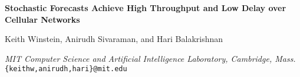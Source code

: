 \documentclass[csaild4,portrait]{xa0poster}
\title{}
\author{}
\affiliation{}
\begin{document}
\maketitle
\vspace{-7.9in} %

\begin{centering}
{\large \bf Stochastic Forecasts Achieve High Throughput and Low Delay over Cellular Networks}

\vspace{\baselineskip}

Keith Winstein, Anirudh Sivaraman, and Hari Balakrishnan

\textit{MIT Computer Science and Artificial Intelligence Laboratory, Cambridge, Mass.} \\
\texttt{\{keithw,anirudh,hari\}@mit.edu}

\end{centering}

\vspace{\baselineskip}



%

\end{document}
